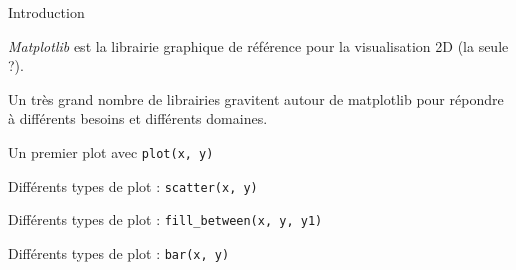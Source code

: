 \begin{frame}{Introduction}

    \emph{Matplotlib} est la librairie graphique de référence pour la visualisation 2D (la seule ?).
    
    Un très grand nombre de librairies gravitent autour de matplotlib pour répondre à différents besoins et différents domaines.
\end{frame}

\begin{frame}{Un premier plot avec \texttt{plot(x, y)}}
    \begin{minipage}[t]{0.49\linewidth}
    \end{minipage}
    \begin{minipage}[t]{0.49\linewidth}
        \vfill
    \end{minipage}
\end{frame}

\begin{frame}{Différents types de plot : \texttt{scatter(x, y)}}
    \begin{minipage}[t]{0.49\linewidth}
    \end{minipage}
    \begin{minipage}[t]{0.49\linewidth}
        \vfill
    \end{minipage}
\end{frame}

\begin{frame}{Différents types de plot : \texttt{fill\_between(x, y, y1)}}
    \begin{minipage}[t]{0.49\linewidth}
    \end{minipage}
    \begin{minipage}[t]{0.49\linewidth}
        \vfill
    \end{minipage}
\end{frame}

\begin{frame}{Différents types de plot : \texttt{bar(x, y)}}
    \begin{minipage}[t]{0.49\linewidth}
    \end{minipage}
    \begin{minipage}[t]{0.49\linewidth}
        \vfill
    \end{minipage}
\end{frame}

